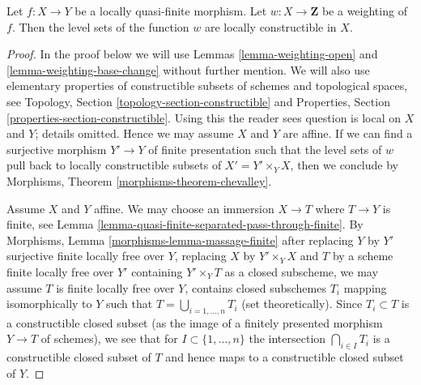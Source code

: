 \begin{lemma}
\label{lemma-jumps-w}
Let $f : X \to Y$ be a locally quasi-finite morphism.
Let $w : X \to \mathbf{Z}$ be a weighting of $f$. Then
the level sets of the function $w$ are locally constructible in $X$.
\end{lemma}

\begin{proof}
In the proof below we will use Lemmas \ref{lemma-weighting-open} and
\ref{lemma-weighting-base-change} without further mention.
We will also use elementary properties of constructible subsets
of schemes and topological spaces, see
Topology, Section \ref{topology-section-constructible} and
Properties, Section \ref{properties-section-constructible}.
Using this the reader sees question is local on $X$ and $Y$;
details omitted. Hence we may assume $X$ and $Y$ are affine.
If we can find a surjective morphism $Y' \to Y$
of finite presentation such that the level sets of $w$
pull back to locally constructible subsets of $X' = Y' \times_Y X$,
then we conclude by Morphisms, Theorem \ref{morphisms-theorem-chevalley}.

\medskip\noindent
Assume $X$ and $Y$ affine. We may choose an immersion $X \to T$
where $T \to Y$ is finite, see
Lemma \ref{lemma-quasi-finite-separated-pass-through-finite}.
By Morphisms, Lemma \ref{morphisms-lemma-massage-finite}
after replacing $Y$ by $Y'$ surjective finite locally free over $Y$,
replacing $X$ by $Y' \times_Y X$ and $T$ by a scheme finite locally
free over $Y'$ containing $Y' \times_Y T$ as a closed subscheme,
we may assume $T$ is finite locally free over $Y$,
contains closed subschemes $T_i$ mapping isomorphically to $Y$
such that $T = \bigcup_{i = 1, \ldots, n} T_i$ (set theoretically).
Since $T_i \subset T$ is a constructible closed subset (as the image
of a finitely presented morphism $Y \to T$ of schemes), we see
that for $I \subset \{1, \ldots, n\}$ the intersection
$\bigcap_{i \in I} T_i$ is a constructible closed subset of $T$
and hence maps to a constructible closed subset of $Y$.


\end{proof}
